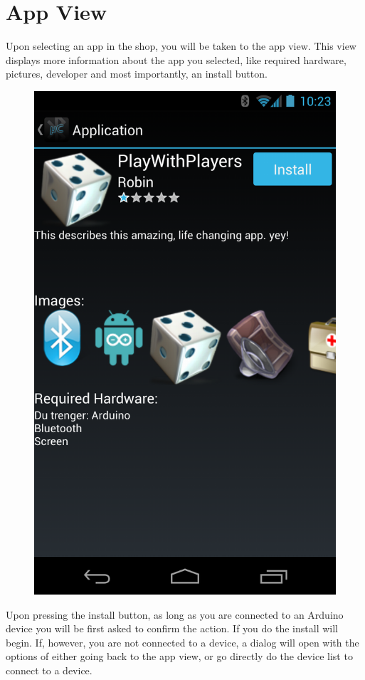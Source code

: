 \chapter{App View}
Upon selecting an app in the shop, you will be taken to the app view. This view displays more information about the app you selected, like required hardware, pictures, developer and most importantly, an install button. 
\newline
\begin{figure}[H]
	\centering
	\includegraphics[scale = 0.3]{images/Screenshots/app_view.png}
\end{figure}
\newline
Upon pressing the install button, as long as you are connected to an Arduino device you will be first asked to confirm the action. If you do the install will begin. If, however, you are not connected to a device, a dialog will open with the options of either going back to the app view, or go directly do the device list to connect to a device.

